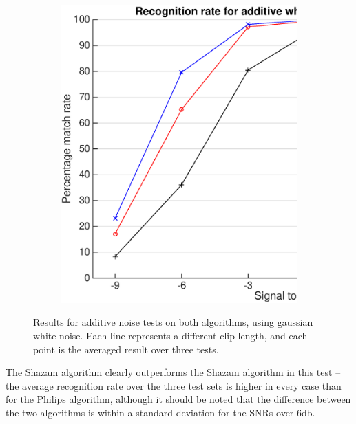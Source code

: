 \documentclass[12pt,a4paper,twoside,openright]{report}
\begin{document}
\begin{figure}[p]
    \vspace{10mm}

    \begin{subfigure}{\textwidth}
      \includegraphics[width=\textwidth]{./figs/gaussian_shazam_results.eps} 
    \end{subfigure}

    \vspace{15mm}

    \caption{Results for additive noise tests on both algorithms, using gaussian white noise. Each line represents a different clip length, and each point is the averaged result over three tests.}
    \label{fig:gaussian_results}
\end{figure}

The Shazam algorithm clearly outperforms the Shazam algorithm in this test -- the average recognition rate over the three test sets is higher in every case than for the Philips algorithm, although it should be noted that the difference between the two algorithms is within a standard deviation for the SNRs over 6db.
\end{document}
